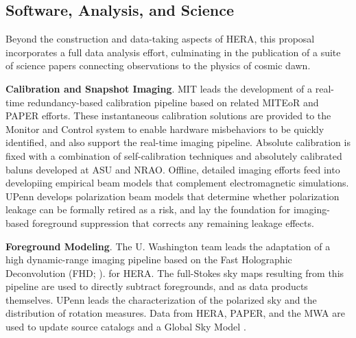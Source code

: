 \documentclass[preprint]{aastex}
\newcommand{\compress}{\vspace{-0.3in}}
\begin{document}
\compress
\subsection{Software, Analysis, and Science}
\label{sec:analysis}

Beyond the construction and data-taking aspects of HERA, this proposal
incorporates a full data analysis effort, culminating in the publication of a
suite of science papers connecting observations to the physics of cosmic dawn.


\label{sec:calibration} %

{\bf Calibration and Snapshot Imaging}. MIT leads
the development of a real-time redundancy-based calibration pipeline based on related
MITEoR and PAPER efforts.
These instantaneous calibration solutions are provided to
the Monitor and Control system to enable 
hardware misbehaviors to be quickly identified, and also support the
real-time imaging pipeline.  Absolute calibration is fixed with
a combination of self-calibration techniques and absolutely calibrated baluns developed at ASU and NRAO.
Offline, detailed imaging efforts feed into developiing
empirical beam models that
complement electromagnetic simulations.  UPenn develops polarization beam models
that determine whether polarization leakage can be formally retired as 
a risk, and lay the foundation for imaging-based foreground suppression that
corrects any remaining leakage effects.

\label{sec:DataProducts} %

{\bf Foreground Modeling}. The U. Washington team leads the adaptation
of a high dynamic-range imaging pipeline
based on the Fast Holographic Deconvolution (FHD; \citealt{sullivan_et_al2012}).
for HERA.  The full-Stokes sky maps resulting from this pipeline
are used to directly subtract foregrounds,
and as data products themselves.  UPenn leads
the characterization of the polarized sky and the
distribution of rotation measures.  Data from HERA, PAPER, and the MWA are used
to update source catalogs and a Global
Sky Model \citep{deoliveira2008}. %
\end{document}
